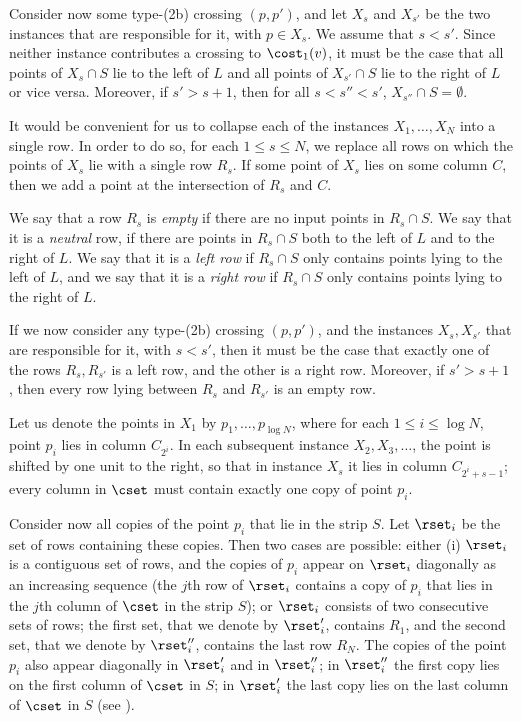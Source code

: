 Consider now some type-(2b) crossing $(p,p')$, and let $X_s$ and $X_{s'}$ be the two instances that are responsible for it, with $p\in X_s$. We assume that $s<s'$. Since neither instance contributes a crossing to $\cost_1(v)$, it must be the case that all points of $X_s\cap S$ lie to the left of $L$ and all points of $X_{s'}\cap S$ lie to the right of $L$ or vice versa.
Moreover, if $s'>s+1$, then for all $s<s''<s'$, $X_{s''}\cap S=\emptyset$.

It would be convenient for us to collapse each of the instances $X_1,\ldots,X_{N}$ into a single row. In order to do so, for each $1\leq s\leq N$, we replace all rows on which the points of $X_s$ lie with a single row $R_s$. If some point of $X_s$ lies on some column $C$, then we add a point at the intersection of $R_s$ and $C$.

We say that a row $R_s$ is \emph{empty} if there are no input points in $R_s\cap S$. We say that it is a \emph{neutral} row, if there are points in $R_s\cap S$ both to the left of $L$ and to the right of $L$. We say that it is a \emph{left row} if $R_s\cap S$ only contains points lying to the left of $L$, and we say that it is a \emph{right row} if $R_s\cap S$ only contains points lying to the right of $L$.

If we now consider any type-(2b) crossing $(p,p')$, and the instances $X_s,X_{s'}$ that are responsible for it, with $s<s'$, then it must be the case that exactly one of the rows $R_s,R_{s'}$ is a left row, and the other is a right row. Moreover, if $s'>s+1$, then every row lying between $R_s$ and $R_{s'}$ is an empty row.

Let us denote the points in $X_1$ by $p_1,\ldots,p_{\log N}$, where for each $1\leq i\leq \log N$, point $p_i$ lies in column $C_{2^i}$. 
In each subsequent instance $X_2,X_3,\ldots$, the point is shifted by one unit to the right, so that in instance $X_s$ it lies in column $C_{2^i+s-1}$; every column in $\cset$ must contain exactly one copy of point $p_i$.

Consider now all copies of the point $p_i$ that lie in the strip $S$. Let $\rset_i$ be the set of rows containing these copies. Then two cases are possible: either (i) $\rset_i$ is a contiguous set of rows, and the copies of $p_i$ appear on $\rset_i$ diagonally as an increasing sequence (the $j$th row of $\rset_i$ contains a copy of $p_i$ that lies in the $j$th column of $\cset$ in the strip $S$); or $\rset_i$ consists of two consecutive sets of rows; the first set, that we denote by $\rset'_i$, contains $R_1$, and the second set, that we denote by $\rset''_i$, contains the last row $R_{N}$. The copies of the point $p_i$ also appear diagonally in $\rset'_i$ and in $\rset''_i$; in $\rset''_i$ the first copy lies on the first column of $\cset$ in $S$; in $\rset'_i$ the last copy lies on the last column of $\cset$ in $S$ (see ).

